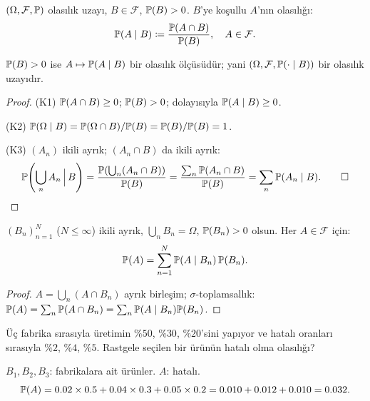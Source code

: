 \begin{tanim}\label{def:kos_olasilik}
$(\Omega,\mathcal{F},\mathbb{P})$ olasılık uzayı, $B \in \mathcal{F}$, $\mathbb{P}(B) > 0$.
$B$'ye koşullu $A$'nın olasılığı:
\[
  \mathbb{P}(A \mid B) \coloneqq \frac{\mathbb{P}(A \cap B)}{\mathbb{P}(B)}, \quad A \in \mathcal{F}.
\]
\end{tanim}

\begin{teorem}\label{thm:kos_olcu}
$\mathbb{P}(B) > 0$ ise $A \mapsto \mathbb{P}(A \mid B)$ bir olasılık ölçüsüdür;
yani $(\Omega, \mathcal{F}, \mathbb{P}(\cdot \mid B))$ bir olasılık uzayıdır.
\end{teorem}

\begin{proof}
(K1) $\mathbb{P}(A \cap B) \geq 0$; $\mathbb{P}(B) > 0$; dolayısıyla $\mathbb{P}(A \mid B) \geq 0$.

(K2) $\mathbb{P}(\Omega \mid B) = \mathbb{P}(\Omega \cap B)/\mathbb{P}(B) = \mathbb{P}(B)/\mathbb{P}(B) = 1$.

(K3) $(A_n)$ ikili ayrık; $(A_n \cap B)$ da ikili ayrık:
\[
  \mathbb{P}\!\left(\bigcup_n A_n \,\Big|\, B\right)
  = \frac{\mathbb{P}\!\left(\bigcup_n (A_n \cap B)\right)}{\mathbb{P}(B)}
  = \frac{\sum_n \mathbb{P}(A_n \cap B)}{\mathbb{P}(B)}
  = \sum_n \mathbb{P}(A_n \mid B).  \qed
\]
\end{proof}

\begin{teorem}\label{thm:toplam_olasilik}
$(B_n)_{n=1}^N$ ($N \leq \infty$) ikili ayrık, $\bigcup_n B_n = \Omega$,
$\mathbb{P}(B_n) > 0$ olsun. Her $A \in \mathcal{F}$ için:
\[
  \mathbb{P}(A) = \sum_{n=1}^N \mathbb{P}(A \mid B_n)\, \mathbb{P}(B_n).
\]
\end{teorem}

\begin{proof}
$A = \bigcup_n (A \cap B_n)$ ayrık birleşim; $\sigma$-toplamsallık:
$\mathbb{P}(A) = \sum_n \mathbb{P}(A \cap B_n) = \sum_n \mathbb{P}(A \mid B_n)\mathbb{P}(B_n)$.
\end{proof}

\begin{ornek}\label{ex:fabrika}
Üç fabrika sırasıyla üretimin $\%50$, $\%30$, $\%20$'sini yapıyor ve
hatalı oranları sırasıyla $\%2$, $\%4$, $\%5$. Rastgele seçilen bir
ürünün hatalı olma olasılığı?

$B_1, B_2, B_3$: fabrikalara ait ürünler. $A$: hatalı.
\[
  \mathbb{P}(A) = 0.02 \times 0.5 + 0.04 \times 0.3 + 0.05 \times 0.2
           = 0.010 + 0.012 + 0.010 = 0.032.
\]
\end{ornek}

